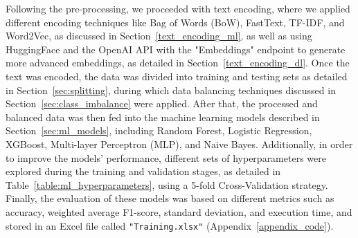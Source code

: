 Following the pre-processing, we proceeded with text encoding, where we applied different encoding techniques like Bag of Words (BoW), FastText, TF-IDF, and Word2Vec, as discussed in Section~\ref{text_encoding_ml}, as well as using HuggingFace and the OpenAI API with the "Embeddings" endpoint to generate more advanced embeddings, as detailed in Section~\ref{text_encoding_dl}. Once the text was encoded, the data was divided into training and testing sets as detailed in Section~\ref{sec:splitting}, during which data balancing techniques discussed in Section~\ref{sec:class_imbalance} were applied. After that, the processed and balanced data was then fed into the machine learning models described in Section~\ref{sec:ml_models}, including Random Forest, Logistic Regression, XGBoost, Multi-layer Perceptron (MLP), and Naive Bayes. Additionally, in order to improve the models' performance, different sets of hyperparameters were explored during the training and validation stages, as detailed in Table~\ref{table:ml_hyperparameters}, using a 5-fold Cross-Validation strategy. Finally, the evaluation of these models was based on different metrics such as accuracy, weighted average F1-score, standard deviation, and execution time, and stored in an Excel file called \texttt{"Training.xlsx"} (Appendix~\ref{appendix_code}).



